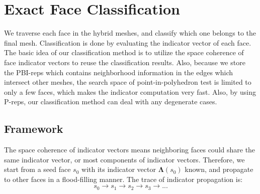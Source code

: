 \documentclass[10pt,journal,compsoc]{IEEEtran}
\begin{document}


\section{Exact Face Classification}

\label{sec:classification}
We traverse each face in the hybrid meshes, and classify which one belongs to the final mesh. Classification is done by evaluating the indicator vector of each face. The basic idea of our classification method is to utilize the space coherence of face indicator vectors to reuse the classification results. Also, because we store the PBI-reps which contains neighborhood information in the edges which intersect other meshes, the search space of point-in-polyhedron test is limited to only a few faces, which makes the indicator computation very fast. Also, by using P-reps, our classification method can deal with any degenerate cases.

\subsection{Framework}

The space coherence of indicator vectors means neighboring faces could share the same indicator vector, or most components of indicator vectors. Therefore, we start from a seed face $s_0$ with its indicator vector $\bm{\Lambda}(s_0)$ known, and propagate to other faces in a flood-filling manner. The trace of indicator propagation is:
\begin{equation}
\label{eq:trace}
s_0\to s_1\to s_2\to s_3\to ...
\end{equation}
\end{document}
